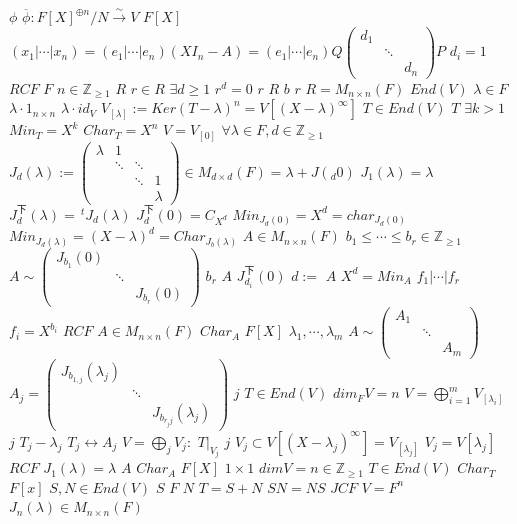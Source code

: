 \documentclass{article}
\begin{document}
$\phi$
$\overline{\phi}:F[X]^{\oplus n}/N \stackrel{\sim}{\longrightarrow} V$
$F[X]$
$(x_1|\cdots|x_n)=(e_1|\cdots|e_n)(XI_n-A)=(e_1|\cdots|e_n)Q \begin{pmatrix}d_1\\&\ddots\\&&d_n\end{pmatrix}P$
$d_i=1$
$RCF$
$F$
$n \in \mathbb{Z}_{\geq 1}$
$R$
$r \in R$
$\exists d \geq 1$
$r^d=0$
$r$
$R$
$b$
$r$
$R=M_{n \times n}(F)$
$End(V)$
$\lambda \in F$
$\lambda \cdot 1_{n \times n}$
$\lambda \cdot id_V$
$V_{[\lambda]}:=Ker(T-\lambda)^n=V[(X-\lambda)^\infty]$
$T \in End(V)$
$T$
$\exists k >1$
$Min_T=X^k$
$Char_T=X^n$
$V=V_{[0]}$
$\forall \lambda \in F, d \in \mathbb{Z}_{\geq 1}$
$J_d(\lambda):=\begin{pmatrix}\lambda &1\\&\ddots&\ddots\\&&\ddots &1\\ &&& \lambda\end{pmatrix} \in M_{d \times d}(F)=\lambda+J(_d0)$
$J_1(\lambda)=\lambda$
$J_d^{下}(\lambda)=\,^tJ_d(\lambda)$
$J_d^{下}(0)=C_{X^d}$
$Min_{J_d(0)}=X^d=char_{J_d(0)}$
$Min_{J_d(\lambda)}=(X-\lambda)^d=Char_{J_b(\lambda)}$
$A \in M_{n \times n}(F)$
$b_1 \leq \cdots \leq b_r \in \mathbb{Z}_{\geq 1}$
$A \sim \begin{pmatrix}J_{b_1}(0)\\&\ddots\\&&J_{b_r}(0) \end{pmatrix}$
$b_r$
$A$
$J_{d_i}^{下}(0)$
$d:=$
$A$
$X^d=Min_A$
$f_1|\cdots|f_r$
$f_i=X^{b_i}$
$RCF$
$A \in M_{n \times n}(F)$
$Char_A$
$F[X]$
$\lambda_1,\cdots,\lambda_m$
$A \sim \begin{pmatrix}A_1\\&\ddots\\&&A_m\end{pmatrix}$
$A_j=\begin{pmatrix}J_{b_{1,j}}(\lambda_j)\\&\ddots\\&&J_{b_{r_jj}}(\lambda_j)\end{pmatrix}$
$j$
$T \in End(V)$
$dim_FV=n$
$V=\bigoplus_{i=1}^mV_{[\lambda_i]}$
$j$
$T_j-\lambda_j$
$T_j \leftrightarrow A_j$
$V=\bigoplus_jV_j:$
$T|_{V_j}$
$j$
$V_j \subset V[(X-\lambda_j)^\infty]=V_{[\lambda_j]}$
$V_j=V[\lambda_j]$
$RCF$
$J_1(\lambda)=\lambda$
$A$
$Char_A$
$F[X]$
$1 \times 1$
$dimV=n \in \mathbb{Z}_{\geq 1}$
$T \in End(V)$
$Char_T$
$F[x]$
$S,N \in End(V)$
$S$
$F$
$N$
$T=S+N$
$SN=NS$
$JCF$
$V=F^n$
$J_n(\lambda) \in M_{n \times n}(F)$
\end{document}

